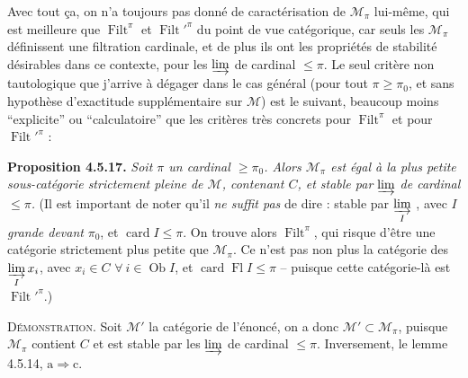 \documentclass[11pt]{article}
\newcommand{\msp}[1]{\marginpar{\footnotesize [#1]}}
\newcommand{\Filt}{\operatorname{Filt}}
\newcommand{\card}{\operatorname{card}}
\newcommand{\Fl}{\operatorname{Fl}}
\newcommand{\Ob}{\operatorname{Ob}}
\begin{document}
Avec tout ça, on n'a toujours pas donné de caractérisation de $\mathcal{M}_{\pi}$ lui-même, qui est meilleure que $\Filt^{\pi}$ et $\Filt'^{\pi}$ du point de vue catégorique, car seuls les $\mathcal{M}_{\pi}$ définissent une filtration cardinale, et de plus ils ont les propriétés de stabilité désirables dans ce
\msp{page 138}
contexte, pour les $\varinjlim$ de cardinal $\leqslant \pi$. Le seul critère non tautologique que j'arrive à dégager dans le cas général (pour tout $\pi \geqslant \pi_0$, et sans hypothèse d'exactitude supplémentaire sur $\mathcal{M}$) est le suivant, beaucoup moins ``explicite'' ou ``calculatoire'' que les critères très concrets pour $\Filt^{\pi}$ et pour $\Filt'^{\pi}$ :

\textbf{Proposition 4.5.17.} \textit{Soit $\pi$ un cardinal $\geqslant \pi_0$. Alors $\mathcal{M}_{\pi}$ est égal à la plus petite sous-catégorie strictement pleine de $\mathcal{M}$, contenant $C$, et stable par} $\varinjlim$ \textit{de cardinal $\leqslant \pi$.} (Il est important de noter qu'il \textit{ne suffit pas} de dire : stable par $\varinjlim\limits_{I}$ , avec \textit{$I$ grande devant} $\pi_0$, et $\card I \leqslant \pi$. On trouve alors $\Filt^{\pi}$, qui risque d'être une catégorie strictement plus petite que $\mathcal{M}_{\pi}$. Ce n'est pas non plus la catégorie des $\varinjlim\limits_{I} x_i$, avec $x_i \in C$ $\forall\ i \in \Ob I$, et $\card \Fl I \leqslant \pi$ -- puisque cette catégorie-là est $\Filt'^{\pi}$.)

\textsc{Démonstration}. Soit $\mathcal{M}'$ la catégorie de l'énoncé, on a donc $\mathcal{M}' \subset \mathcal{M}_{\pi}$, puisque $\mathcal{M}_{\pi}$ contient $C$ et est stable par les $\varinjlim$ de cardinal $\leqslant \pi$. Inversement, le lemme 4.5.14, $\mathrm{a} \Longrightarrow \mathrm{c}$.
\end{document}
